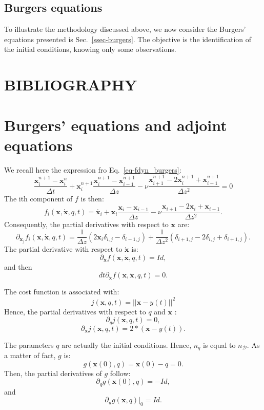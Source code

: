 \documentclass[aip,pof,nofootinbib,reprint,onecolumn]{revtex4-1}
\newcommand{\gras}[1]{\boldsymbol{#1}}
\newcommand{\mypar}[1]{\left(#1\right)}
\newcommand{\Nphaz}{n_{\mathcal{D}}} %
\newcommand{\fdyn}{f} %
\newcommand{\costff}{j} %
\newcommand{\obs}{y} %
\newcommand{\point}{\gras{x}} %
\begin{document}
%

\subsection{Burgers equations}  \label{ssec-results-burgers}
To illustrate the methodology discussed above, we now consider the Burgers' equations presented is Sec.~\ref{ssec-burgers}.
The objective is the identification of the initial conditions, knowing only some observations.



\section*{BIBLIOGRAPHY}


\appendix
\section{Burgers' equations and adjoint equations}
\label{an-burgers}
We recall here the expression fro Eq.~\eqref{eq-fdyn_burgers}:
$$ \frac{\point^{n+1}_i - \point^{n}_i}{\Delta t} + \point^{n+1}_i \frac{\point^{n+1}_i - \point^{n+1}_{i-1}}{\Delta z} - \nu \frac{\point^{n+1}_{i+1} -2 \point^{n+1}_i + \point^{n+1}_{i-1}}{\Delta z ^2} = 0 $$
The ith component of $\fdyn$ is then:
$$\fdyn_i\mypar{\point,\dot{\point},q,t} = \dot{\point_i} + \point_i \frac{\point_i - \point_{i-1}}{\Delta z} - \nu \frac{\point_{i+1} -2 \point_i + \point_{i-1}}{\Delta z ^2}. $$
Consequently, the partial derivatives with respect to $\point$ are:
$$\partial_{\point_j} \fdyn_i\mypar{\point,\dot{\point},q,t} = \frac{1}{\Delta z }\mypar{2 \point_i \delta_{i,j} - \delta_{i-1,j}} + \frac{1}{\Delta z ^2}\mypar{\delta_{i+1,j} - 2 \delta_{i,j} + \delta_{i+1,j}}.$$
The partial derivative with respect to $\dot{\point}$ is:
$$\partial_{\dot{\point}} \fdyn\mypar{\point,\dot{\point},q,t}  = Id,$$
and then $$dt\partial_{\dot{\point}} \fdyn\mypar{\point,\dot{\point},q,t}  = 0. $$

The cost function is associated with:
$$\costff\mypar{\point,q,t} = || \point-\obs(t)||^2$$
Hence, the partial derivatives with respect to $q$ and $\point$ :
$$\partial_q \costff\mypar{\point,q,t} = 0,$$
$$\partial_{\point} \costff\mypar{\point,q,t} = 2*\mypar{\point-\obs(t)}.$$

The parameters $q$ are actually the initial conditions. Hence, $n_q$ is equal to $\Nphaz$. As a matter of fact, $g$ is:
$$g(\point(0),q) = \point(0)-q = 0.$$
Then, the partial derivatives of $g$ follow:
$$\partial_q g(\point(0),q) = -Id,$$
and
$$\partial_u g(\point,q)|_0 = Id.$$
\end{document}
